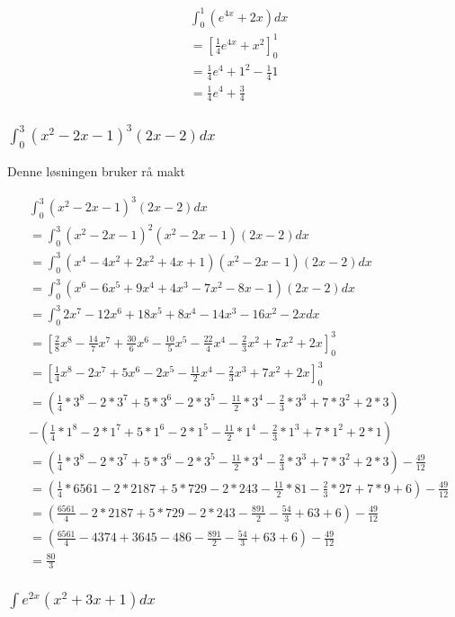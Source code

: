 \documentclass{article}
\begin{document}
\begin{align*}
    & \int_{0}^{1} (e^{4x}+2x) dx \\
    & = [\frac{1}{4} e^{4x} + x^2]^1_0 \\
    &= \frac{1}{4} e^4 + 1^2 - \frac{1}{4}1 \\
    &= \frac{1}{4} e^4 + \frac{3}{4}
\end{align*}

\subsubsection{$\int_{0}^{3} (x^2-2x-1)^3(2x-2) dx$}

Denne løsningen bruker rå makt

\begin{align*}
    & \int_{0}^{3} (x^2-2x-1)^3(2x-2) dx \\
    &= \int_{0}^{3} (x^2-2x-1)^2(x^2-2x-1)(2x-2) dx \\
    &= \int_{0}^{3} (x^4-4x^2+2x^2+4x+1)(x^2-2x-1)(2x-2) dx \\
    &= \int_{0}^{3} (x^6-6x^5+9x^4+4x^3-7x^2-8x-1)(2x-2) dx \\
    &= \int_{0}^{3} 2x^7-12x^6+18x^5+8x^4-14x^3-16x^2-2x dx \\
    &= [\frac{2}{8}x^8-\frac{14}{7}x^7+\frac{30}{6}x^6-\frac{10}{5}x^5-\frac{22}{4}x^4-\frac{2}{3}x^2+7x^2+2x]^3_0 \\
    &= [\frac{1}{4}x^8-2x^7+5x^6-2x^5-\frac{11}{2}x^4-\frac{2}{3}x^3+7x^2+2x]^3_0 \\
    &= (\frac{1}{4}*3^8-2*3^7+5*3^6-2*3^5-\frac{11}{2}*3^4-\frac{2}{3}*3^3+7*3^2+2*3) \\
    &- (\frac{1}{4}*1^8-2*1^7+5*1^6-2*1^5-\frac{11}{2}*1^4-\frac{2}{3}*1^3+7*1^2+2*1) \\
    &= (\frac{1}{4}*3^8-2*3^7+5*3^6-2*3^5-\frac{11}{2}*3^4-\frac{2}{3}*3^3+7*3^2+2*3) - \frac{49}{12} \\
    &= (\frac{1}{4}*6561- 2*2187+5*729-2*243-\frac{11}{2}*81-\frac{2}{3}*27+7*9+6) - \frac{49}{12} \\
    &= (\frac{6561}{4}- 2*2187+5*729-2*243-\frac{891}{2}-\frac{54}{3}+63+6) - \frac{49}{12} \\
    &= (\frac{6561}{4}- 4374+3645-486-\frac{891}{2}-\frac{54}{3}+63+6) - \frac{49}{12} \\
    &= \frac{80}{3}
\end{align*}

\subsubsection{$\int e^{2x}(x^2+3x+1) dx$}
\end{document}
